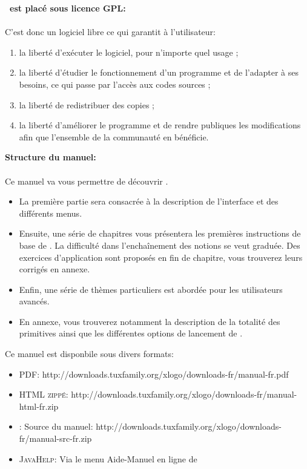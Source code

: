 \noindent \textbf{\xlogo\  est placé sous licence GPL:} \\ \\
C'est donc un logiciel libre ce qui garantit à l'utilisateur:
\begin{enumerate}
 \item la liberté d'exécuter le logiciel, pour n'importe quel usage ;
 \item la liberté d'étudier le fonctionnement d'un programme et de l'adapter à ses besoins, ce qui passe par l'accès aux codes sources ;
 \item la liberté de redistribuer des copies ;
 \item la liberté d'améliorer le programme et de rendre publiques les modifications afin que l'ensemble de la communauté en bénéficie.
\end{enumerate}
\noindent \textbf{Structure du manuel:}\\ \\
Ce manuel va vous permettre de découvrir \xlogo.
\begin{itemize}
 \item La première partie sera consacrée à la description de l'interface et des différents menus.
 \item Ensuite, une série de chapitres vous présentera les premières instructions de base de \xlogo. La difficulté dans l'enchaînement des notions se veut graduée. Des exercices d'application sont proposés en fin de chapitre, vous trouverez leurs corrigés en annexe.
\item Enfin, une série de thèmes particuliers est abordée pour les utilisateurs avancés.
\item En annexe, vous trouverez notamment la description de la totalité des primitives ainsi que les différentes options de lancement de \xlogo.
\end{itemize}
\vspace{0.5cm}
Ce manuel est disponbile sous divers formats:
\begin{itemize}
 \item \textsc{PDF}: http://downloads.tuxfamily.org/xlogo/downloads-fr/manual-fr.pdf
 \item \textsc{HTML zippé}: http://downloads.tuxfamily.org/xlogo/downloads-fr/manual-html-fr.zip
 \item \LaTeXe: Source du manuel: http://downloads.tuxfamily.org/xlogo/downloads-fr/manual-src-fr.zip
 \item \textsc{JavaHelp}: Via le menu Aide-Manuel en ligne de \xlogo
\end{itemize}
